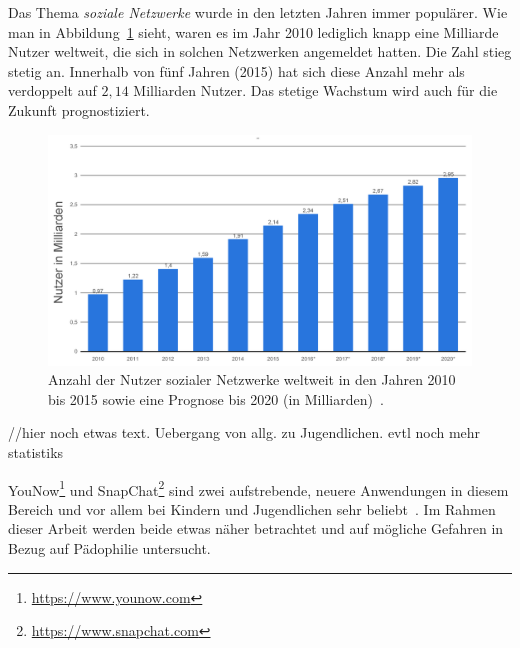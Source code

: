 Das Thema \emph{soziale Netzwerke} wurde in den letzten Jahren immer
popul\"arer. Wie man in Abbildung~\ref{fig:overall} sieht, waren es im Jahr
2010 lediglich knapp eine Milliarde Nutzer weltweit, die sich in solchen
Netzwerken angemeldet hatten. Die Zahl stieg stetig an. Innerhalb von f\"unf
Jahren (2015) hat sich diese Anzahl mehr als verdoppelt auf $2,14$ Milliarden
Nutzer. Das stetige Wachstum wird auch f\"ur die Zukunft prognostiziert.
\begin{figure}[ht]
	\centering
	\includegraphics[scale=0.6]{resources/einf_02.png}
	\caption{Anzahl der Nutzer sozialer Netzwerke weltweit in den Jahren 2010
	bis 2015 sowie eine Prognose bis 2020 (in Milliarden)~\cite{statista-allg}.}
	\label{fig:overall}
\end{figure}

//hier noch etwas text. Uebergang von allg. zu Jugendlichen. evtl noch mehr statistiks

YouNow\footnote{\url{https://www.younow.com}} und
SnapChat\footnote{\url{https://www.snapchat.com}} sind zwei aufstrebende,
neuere Anwendungen in diesem Bereich und vor allem bei Kindern und Jugendlichen
sehr beliebt~\cite{statista-snapchat, vaterlaus2016snapchat}. Im Rahmen dieser Arbeit werden beide
etwas n\"aher betrachtet und auf m\"ogliche Gefahren in Bezug auf P\"adophilie
untersucht.
